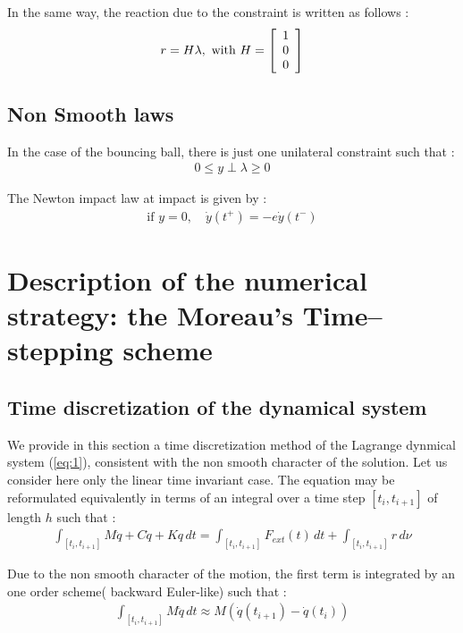 \documentclass[10pt]{article}
\begin{document}
In the same way, the reaction due to the constraint is written as follows : 
\begin{eqnarray}
  \label{eq:16}
  r  = H \lambda, \text{ with } H = \left[
  \begin{array}[]{c}
  1 \\ 0 \\ 0
  \end{array}\right] 
\end{eqnarray}
\subsection{Non Smooth laws}

In the case of the bouncing ball, there is just one unilateral constraint such that :
\begin{eqnarray}
  \label{eq:17}
  0 \leq y \perp \lambda\geq 0
\end{eqnarray}

 The Newton impact law at impact is given by  :
\begin{eqnarray}
  \label{eq:18}
  \text{if } y=0,\quad  \dot y(t^+)= -e   \dot y(t^-)
\end{eqnarray}




\section{Description of the numerical strategy: the Moreau's Time--stepping scheme}
\label{Sec:Simulation}



\subsection{Time discretization of the dynamical system}

We provide in this section a time discretization method of the Lagrange dynmical system (\ref{eq:1}), consistent with the non smooth character of the solution. Let us consider here only the linear time invariant case. The equation  may be reformulated equivalently in terms of an integral over a time step $[t_i,t_{i+1}]$ of length $h$ such that :
\begin{eqnarray}
  \int_{[t_i,t_{i+1}]} M \ddot q + C \dot q + K q \,dt =  \int_{[t_i,t_{i+1}]} F_{ext}(t)\,dt +  \int_{[t_i,t_{i+1}]} r \,d\nu
\end{eqnarray}

Due to the non smooth character of the motion, the first term is integrated by an one order scheme( backward Euler-like) such that :
\begin{eqnarray}
  \label{eq:19}
   \int_{[t_i,t_{i+1}]} M \ddot q  \, dt \approx M (\dot q(t_{i+1})-\dot q(t_{i})) 
\end{eqnarray}
\end{document}

